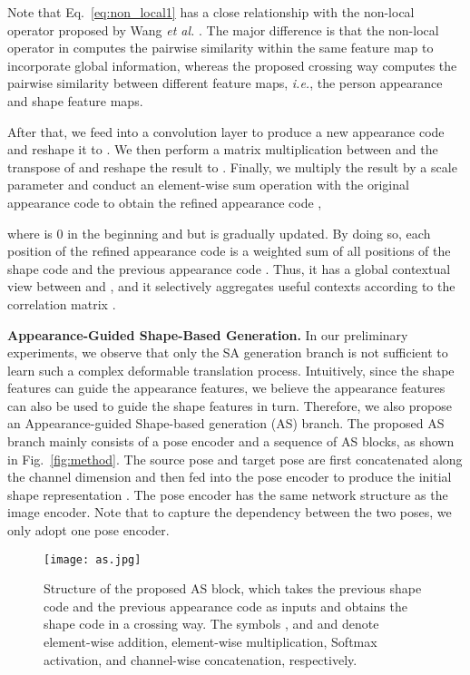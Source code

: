 \documentclass[runningheads]{llncs}
\begin{document}
Note that Eq.~\eqref{eq:non_local1} has a close relationship with the non-local operator proposed by Wang \emph{et al.} \cite{wang2018non}. 
The major difference is that the non-local operator in \cite{wang2018non} computes the pairwise similarity within the same feature map to incorporate global information, whereas the proposed crossing way computes the pairwise similarity between different feature maps, \emph{i.e.}, the person appearance and shape feature maps.

After that, we feed  into a convolution layer to produce a new appearance code  and reshape it to .
We then perform a matrix multiplication between  and the transpose of  and reshape the result to .
Finally, we multiply the result by a scale parameter  and conduct an element-wise sum operation with the original appearance code  to obtain the refined appearance code ,

where  is 0 in the beginning and but is gradually updated. By doing so, each position of the refined appearance code  is a weighted sum of all positions of the shape code  and the previous appearance code .
Thus, it has a global contextual view between  and , and it selectively aggregates useful contexts according to the correlation matrix . 

\noindent \textbf{Appearance-Guided Shape-Based Generation.}
In our preliminary experiments, we observe that only the SA generation branch is not sufficient to learn such a complex deformable translation process. Intuitively, since the shape features can guide the appearance features, we believe the appearance features can also be used to guide the shape features in turn.
Therefore, we also propose an Appearance-guided Shape-based generation (AS) branch.
The proposed AS branch mainly consists of a pose encoder and a sequence of AS blocks, as shown in Fig.~\ref{fig:method}.
The source pose  and target pose  are first concatenated along the channel dimension and then fed into the pose encoder to produce the initial shape representation .
The pose encoder has the same network structure as the image encoder.
Note that to capture the dependency between the two poses, we only adopt one pose encoder.

\begin{figure}[t]
	\centering
	\texttt{[image: as.jpg]}
	\caption{Structure of the proposed AS block, which takes the previous shape code  and the previous appearance code  as inputs and obtains the shape code  in a crossing way. The symbols ,  and  and  denote element-wise addition, element-wise multiplication, Softmax activation, and channel-wise concatenation, respectively.}
	\label{fig:as}
\end{figure}
\end{document}
